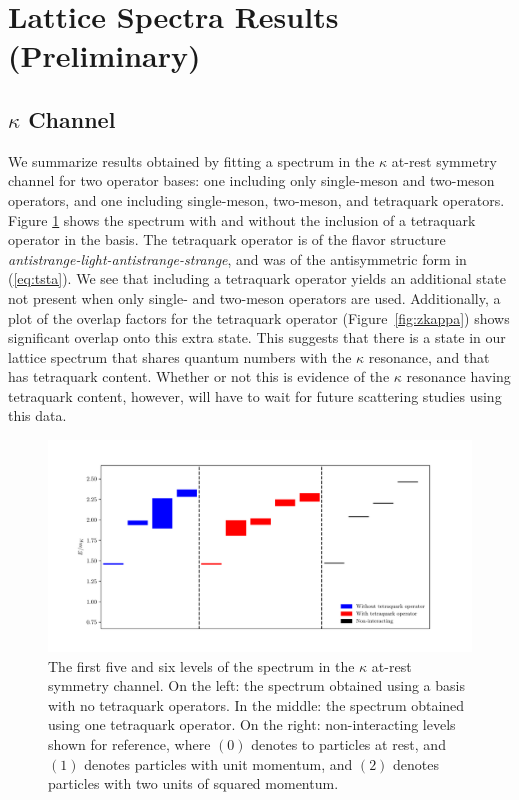 \section{Lattice Spectra Results (Preliminary)}
\subsection{$\kappa$ Channel}
We summarize results obtained by fitting a spectrum in the $\kappa$ at-rest symmetry channel for two operator bases: one including only single-meson and two-meson operators, and one including single-meson, two-meson, and tetraquark operators. Figure \ref{fig:kappa_spectrum} shows the spectrum with and without the inclusion of a tetraquark operator in the basis. The tetraquark operator is of the flavor structure \textit{antistrange-light-antistrange-strange}, and was of the antisymmetric form in (\ref{eq:tsta}). We see that including a tetraquark operator yields an additional state not present when only single- and two-meson operators are used. Additionally, a plot of the overlap factors for the tetraquark operator (Figure~\ref{fig:zkappa}) shows significant overlap onto this extra state. This suggests that there is a state in our lattice spectrum that shares quantum numbers with the $\kappa$ resonance, and that has tetraquark content. Whether or not this is evidence of the $\kappa$ resonance having tetraquark content, however, will have to wait for future scattering studies using this data.
\begin{figure}
  \includegraphics[scale=0.6]{figures/a1g_staircase.pdf}
  \caption{The first five and six levels of the spectrum in the $\kappa$ at-rest symmetry channel. On the left: the spectrum obtained using a basis with no tetraquark operators. In the middle: the spectrum obtained using one tetraquark operator. On the right: non-interacting levels shown for reference, where $(0)$ denotes to particles at rest, and $(1)$ denotes particles with unit momentum, and $(2)$ denotes particles with two units of squared momentum.}\label{fig:kappa_spectrum}
\end{figure}
